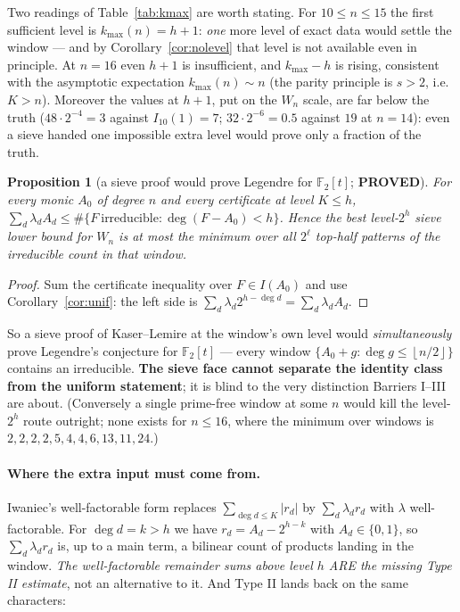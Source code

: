 \documentclass[10pt]{article}
\theoremstyle{plain}
\newtheorem{proposition}[theorem]{Proposition}
\theoremstyle{definition}
\newcommand{\F}{\mathbb F}
\newcommand{\flr}[1]{\left\lfloor #1\right\rfloor}
\newcommand{\proved}{\textcolor{proved}{\textsf{\textbf{\footnotesize PROVED}}}}
\begin{document}
Two readings of Table~\ref{tab:kmax} are worth stating. For $10\le n\le15$ the
first sufficient level is $k_{\max}(n)=h+1$: \emph{one} more level of exact data
would settle the window --- and by Corollary~\ref{cor:nolevel} that level is not
available even in principle. At $n=16$ even $h+1$ is insufficient, and
$k_{\max}-h$ is rising, consistent with the asymptotic expectation
$k_{\max}(n)\sim n$ (the parity principle is $s>2$, i.e.\ $K>n$). Moreover the
values at $h+1$, put on the $W_n$ scale, are far below the truth ($48\cdot2^{-4}=3$
against $I_{10}(1)=7$; $32\cdot2^{-6}=0.5$ against $19$ at $n=14$): even a
sieve handed one impossible extra level would prove only a fraction of the
truth.

\begin{proposition}[{a sieve proof would prove Legendre for $\F_2[t]$; \proved}]
\label{prop:legendre}
For every monic $A_0$ of degree $n$ and every certificate at level $K\le h$,
$\sum_d\lambda_dA_d\le\#\{F\ \text{irreducible}:\deg(F-A_0)<h\}$. Hence the best
level-$2^h$ sieve lower bound for $W_n$ is at most the \emph{minimum over all
$2^{\ell}$ top-half patterns} of the irreducible count in that window.
\end{proposition}

\begin{proof}
Sum the certificate inequality over $F\in I(A_0)$ and use
Corollary~\ref{cor:unif}: the left side is $\sum_d\lambda_d2^{h-\deg d}
=\sum_d\lambda_dA_d$.
\end{proof}

So a sieve proof of Kaser--Lemire at the window's own level would
\emph{simultaneously} prove Legendre's conjecture for $\F_2[t]$ --- every window
$\{A_0+g:\deg g\le\flr{n/2}\}$ contains an irreducible. \textbf{The sieve face
cannot separate the identity class from the uniform statement}; it is blind to
the very distinction Barriers I--III are about. (Conversely a single prime-free
window at some $n$ would kill the level-$2^h$ route outright; none exists for
$n\le16$, where the minimum over windows is $2,2,2,2,5,4,4,6,13,11,24$.)

\paragraph{Where the extra input must come from.} Iwaniec's well-factorable
form replaces $\sum_{\deg d\le K}|r_d|$ by $\sum_d\lambda_dr_d$ with $\lambda$
well-factorable. For $\deg d=k>h$ we have $r_d=A_d-2^{h-k}$ with
$A_d\in\{0,1\}$, so $\sum_d\lambda_dr_d$ is, up to a main term, a bilinear
count of products landing in the window. \emph{The well-factorable remainder
sums above level $h$ ARE the missing Type II estimate}, not an alternative to
it. And Type II lands back on the same characters:
\end{document}
